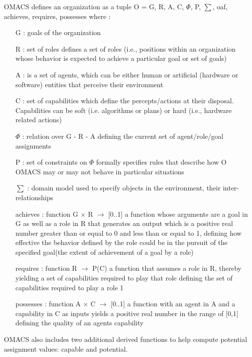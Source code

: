 OMACS defines an organization as a tuple O = \textlangle{} G, R, A, C, $\varPhi$, P, $\sum$, 
oaf, achieves, requires, possesses \textrangle{}
where :
\begin{itemize}
\newcommand{\localtextbulletone}{\textcolor{gray}{\raisebox{.45ex}{\rule{.6ex}{.6ex}}}}
\renewcommand{\labelitemi}{\localtextbulletone}
\item[ G ]  
: goals of the organization 
\item[ R ]  
: set of roles  defines a set of roles (i.e., positions within an organization whose behavior
 is expected to achieve a particular goal or set of goals)
\item[ A ]  
: is a set of agents, which can be either human or artificial (hardware or software)
 entities that perceive their environment
\item[ C ]  
: set of capabilities  which define the percepts/actions at their disposal. Capabilities can be soft 
(i.e. algorithms or plans) or hard (i.e., hardware related actions)
\item[  $\varPhi$ ]  
:  relation over G - R - A defining the current set of agent/role/goal assignments
\item[ P ] 
:  set of constraints on  $\varPhi$  formally specifies rules that describe how O OMACS may or may not 
 behave in particular situations
\item[ $\sum$ ]  
: domain model used to specify objects in the environment, their inter-relationships
\item[ achieves ]   
: function G $\times$ R $\rightarrow$ {[}0..1{]} a function whose arguments are a goal in G   as well
 as a role in R   that generates an output which is a positive real number greater  than or equal to 0 
 and less than or equal to 1, defining how effective the behavior
 defined by the role could be in the pursuit of the specified goal(the extent of achievement of a goal by a role)
\item[requires] 
: function R $\rightarrow$ P(C) a function that assumes a role in R, thereby yielding a set 
of capabilities required to play that role  defining the set of capabilities required to play a role 1
\item[possesses] 
: function A $\times$ C $\rightarrow$ {[}0..1{]} a function with an agent in A and a capability in C 
  as inputs yields a positive real number in the range of [0,1] defining the quality of an agents capability



\end{itemize}
OMACS also includes two additional derived functions to help compute potential assignment values: 
capable and potential.
\cite{omacs0}

